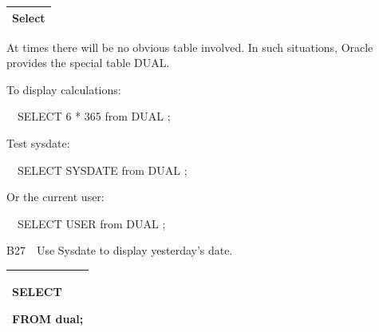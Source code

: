 \begin{flushleft}
\tablefirsthead{}
\tablehead{}
\tabletail{}
\tablelasttail{}
\begin{supertabular}{|m{14.303cm}|}
\hline
Select 

\\\hline
\end{supertabular}
\end{flushleft}
At times there will be no obvious table involved.  In such situations, Oracle provides the special table DUAL.

To display calculations:

\ \ SELECT 6 * 365 from DUAL ;

Test sysdate:

\ \ SELECT SYSDATE from DUAL ;

Or the current user:

\ \ SELECT USER from DUAL ;

B27\ \ Use Sysdate to display yesterday's date.

\begin{flushleft}
\tablefirsthead{}
\tablehead{}
\tabletail{}
\tablelasttail{}
\begin{supertabular}{|m{14.303cm}|}
\hline
SELECT 

FROM dual;

\\\hline
\end{supertabular}
\end{flushleft}
\clearpage